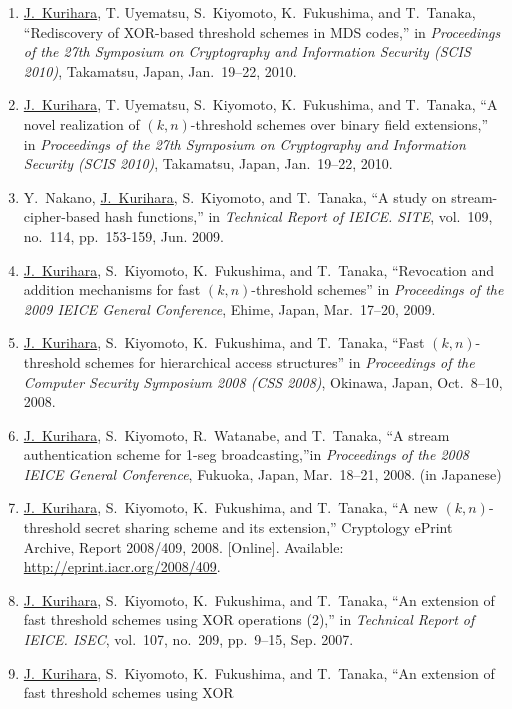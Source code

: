 \begin{enumerate}
 \item \underline{J.~Kurihara}, T. Uyematsu, S.~Kiyomoto, K.~Fukushima,
       and T.~Tanaka, ``Rediscovery of XOR-based threshold schemes in MDS codes,'' in \textit{Proceedings of the 27th
       Symposium on Cryptography and Information Security (SCIS 2010)},
       Takamatsu, Japan, Jan.~19--22, 2010.
 \item \underline{J.~Kurihara}, T. Uyematsu, S.~Kiyomoto, K.~Fukushima,
       and T.~Tanaka, ``A novel realization of $(k,n)$-threshold schemes
       over binary field extensions,'' in \textit{Proceedings of the 27th
       Symposium on Cryptography and Information Security (SCIS 2010)},
       Takamatsu, Japan, Jan.~19--22, 2010.
 \item Y.~Nakano, \underline{J.~Kurihara}, S.~Kiyomoto, and T.~Tanaka, ``A study on stream-cipher-based hash functions,'' in \textit{Technical Report of IEICE. SITE}, vol.~109, no.~114, pp.~153-159, Jun. 2009.
 \item  \underline{J.~Kurihara}, S.~Kiyomoto, K.~Fukushima, and T.~Tanaka, ``Revocation and addition mechanisms for fast $(k, n)$-threshold schemes'' in \textit{Proceedings of the 2009 IEICE General Conference}, Ehime, Japan, Mar.~17--20, 2009.
 \item \underline{J.~Kurihara}, S.~Kiyomoto, K.~Fukushima, and T.~Tanaka, ``Fast $(k,n)$-threshold schemes for hierarchical access structures'' in \textit{Proceedings of the Computer Security Symposium 2008 (CSS 2008)}, Okinawa, Japan, Oct.~8--10, 2008.
 \item \underline{J.~Kurihara}, S.~Kiyomoto, R.~Watanabe, and T.~Tanaka, ``A stream authentication scheme for 1-seg broadcasting,''in \textit{Proceedings of the 2008 IEICE General Conference}, Fukuoka, Japan, Mar.~18--21, 2008. (in Japanese)
 \item \underline{J.~Kurihara}, S.~Kiyomoto, K.~Fukushima, and T.~Tanaka,
       ``A new $(k,n)$-threshold secret sharing scheme and its
       extension,'' Cryptology ePrint Archive, Report 2008/409,
       2008. [Online]. Available: \url{http://eprint.iacr.org/2008/409}.
 \item \underline{J.~Kurihara}, S.~Kiyomoto, K.~Fukushima, and
       T.~Tanaka, ``An extension of fast threshold schemes using XOR
       operations (2),'' in \textit{Technical Report of IEICE. ISEC},
       vol.~107, no.~209, pp.~9--15, Sep. 2007.
 \item \underline{J.~Kurihara}, S.~Kiyomoto, K.~Fukushima, and
       T.~Tanaka, ``An extension of fast threshold schemes using XOR

\end{enumerate}
